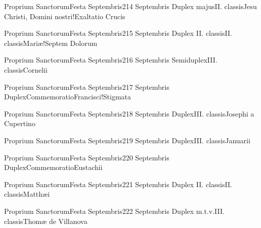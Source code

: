 \documentclass[liber-responsorialis_aestivus.tex]{subfiles}
\begin{document}
	{Proprium Sanctorum}{Festa Septembris}{2}{14 Septembris}
	{Duplex majus}{II. classis}{Jesu Christi, Domini nostri!Exaltatio Crucis}
	{}
	{}

	{Proprium Sanctorum}{Festa Septembris}{2}{15 Septembris}
	{Duplex II. classis}{II. classis}{Mariæ!Septem Dolorum}
	{}
	{}

	{Proprium Sanctorum}{Festa Septembris}{2}{16 Septembris}
	{Semiduplex}{III. classis}{Cornelii}
	{\pmexrubric}
	{\respdetemp}

	{Proprium Sanctorum}{Festa Septembris}{2}{17 Septembris}
	{Duplex}{Commemoratio}{Francisci!Stigmata}
	{\conprubric}
	{\respdetemp}

	{Proprium Sanctorum}{Festa Septembris}{2}{18 Septembris}
	{Duplex}{III. classis}{Josephi a Cupertino}
	{\conprubric}
	{\respdetemp}

	{Proprium Sanctorum}{Festa Septembris}{2}{19 Septembris}
	{Duplex}{III. classis}{Januarii}
	{\pmexrubric}
	{\respdetemp}

	{Proprium Sanctorum}{Festa Septembris}{2}{20 Septembris}
	{Duplex}{Commemoratio}{Eustachii}
	{\pmexrubric}
	{\respdetemp}

	{Proprium Sanctorum}{Festa Septembris}{2}{21 Septembris}
	{Duplex II. classis}{II. classis}{Matthæi}
	{}
	{}
\rubric{\apexrubric}

	{Proprium Sanctorum}{Festa Septembris}{2}{22 Septembris}
	{Duplex m.t.v.}{III. classis}{Thomæ de Villanova}
	{\coporubric}
	{\respdetemp}
\end{document}
